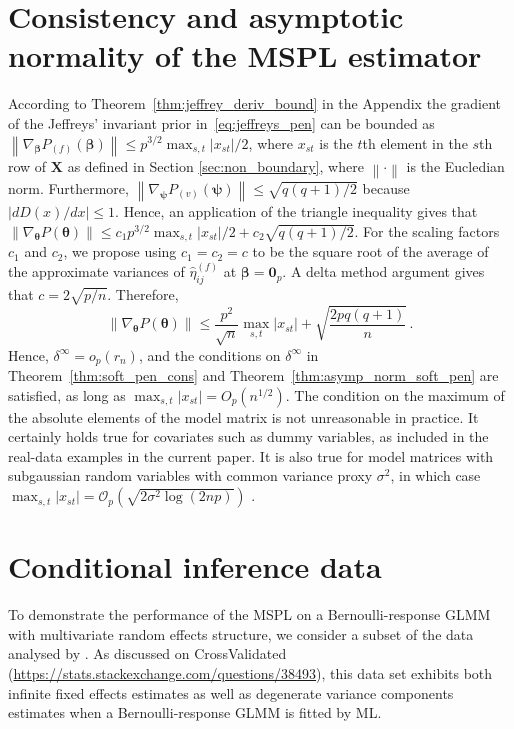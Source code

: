 \documentclass[11pt, a4paper]{article}
\newcommand*{\bb}{\boldsymbol}
\newcommand{\Op}[1]{\ensuremath{{\mathcal{O}_p(#1)}}}
\newcommand{\vnorm}[1]{\ensuremath{{\left\| #1 \right\|}}}
\theoremstyle{example} \newtheorem{example}{Example}[section]
\theoremstyle{theorem} \newtheorem{theorem}{Theorem}[section]
\def\bbeta{\bb{\beta}}
\def\btheta{\bb{\theta}}
\def\bpsi{\bb{\psi}}
\def\b0{\bb{0}}
\def\bX{\bb{X}}
\begin{document}
\section{Consistency and asymptotic normality of the MSPL estimator}
\label{sec:asymptotics}
According to Theorem~\ref{thm:jeffrey_deriv_bound} in the Appendix
the gradient of the Jeffreys' invariant prior
in~\eqref{eq:jeffreys_pen} can be bounded as
$\vnorm{\nabla_{\bbeta} P_{(f)}(\bbeta)} \le p^{3/2} \max_{s,t}
|x_{st}|/2$, where $x_{st}$ is the $t$th element in the $s$th row of
$\bX$ as defined in Section \ref{sec:non_boundary}, where
$\vnorm{\cdot}$ is the Eucledian norm. Furthermore,
$\vnorm{\nabla_{\bpsi} P_{(v)}(\bpsi)} \le \sqrt{q(q+1)/2}$ because
$|d D(x) / dx| \le 1$. Hence, an application of the triangle
inequality gives that
$\vnorm{\nabla_{\btheta} P(\btheta)} \le c_1 p^{3/2} \max_{s, t}
|x_{st}| / 2 + c_2 \sqrt{q(q+1) / 2}$. For the scaling factors $c_1$
and $c_2$, we propose using $c_1 = c_2 = c$ to be the square root of
the average of the approximate variances of $\hat\eta_{ij}^{(f)}$ at
$\bbeta = \b0_p$. A delta method argument gives that
$c = 2 \sqrt{p/n}$. Therefore,
\[
\vnorm{\nabla_{\btheta} P(\btheta)} \le \frac{p^{2}}{\sqrt{n}} \max_{s, t} |x_{st}|  +  \sqrt{\frac{2pq(q+1)}{n}} \, .
\]
Hence, $\delta^\infty = o_p(r_n)$, and the conditions on
$\delta^\infty$ in Theorem~\ref{thm:soft_pen_cons} and
Theorem~\ref{thm:asymp_norm_soft_pen} are satisfied, as long as
$\max_{s, t} |x_{st}| = O_p(n^{1/2})$. The condition on the maximum of
the absolute elements of the model matrix is not unreasonable in
practice. It certainly holds true for covariates such as dummy
variables, as included in the real-data examples in the current
paper. It is also true for model matrices with subgaussian random
variables with common variance proxy $\sigma^2$, in which case
$\max_{s,t} |x_{st} | = \Op{\sqrt{2\sigma^2 \log(2np)}}$ \citep[see,
for example,][Theorem 1.14]{rigollet:2015}.

\section{Conditional inference data} 
\label{sec:ci}
To demonstrate the performance of the MSPL on a Bernoulli-response
GLMM with multivariate random effects structure, we consider a subset
of the data analysed by \citet{singmann+etal:2016}. As discussed on
CrossValidated
(\url{https://stats.stackexchange.com/questions/38493}), this data set
exhibits both infinite fixed effects estimates as well as degenerate
variance components estimates when a Bernoulli-response GLMM is fitted
by ML.
	
\end{document}
